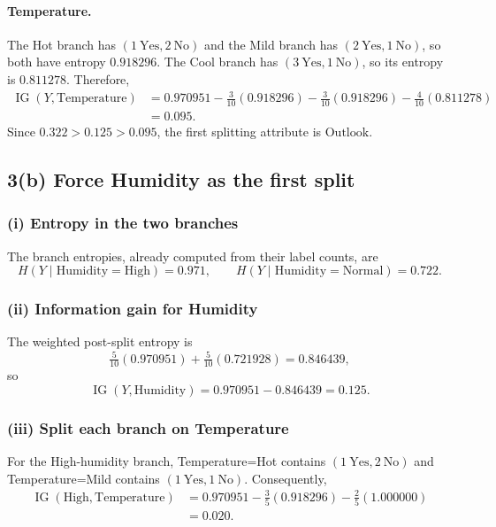 \documentclass[11pt]{article}
\newcommand{\entropy}{H}
\newcommand{\IG}{\operatorname{IG}}
\begin{document}
\paragraph{Temperature.}
The Hot branch has $(1\ \mathrm{Yes},2\ \mathrm{No})$ and the Mild branch has
$(2\ \mathrm{Yes},1\ \mathrm{No})$, so both have entropy $0.918296$.  The Cool
branch has $(3\ \mathrm{Yes},1\ \mathrm{No})$, so its entropy is $0.811278$.
Therefore,
\begin{align*}
\IG(Y,\mathrm{Temperature})
&=0.970951-\tfrac3{10}(0.918296)-\tfrac3{10}(0.918296)
 -\tfrac4{10}(0.811278)\\
&=\boxed{0.095}.
\end{align*}
Since $0.322>0.125>0.095$, the first splitting attribute is
\(\boxed{\mathrm{Outlook}}\).

\subsection*{3(b) Force Humidity as the first split}

\subsubsection*{(i) Entropy in the two branches}
The branch entropies, already computed from their label counts, are
\[
\boxed{\entropy(Y\mid \mathrm{Humidity=High})=0.971},
\qquad
\boxed{\entropy(Y\mid \mathrm{Humidity=Normal})=0.722}.
\]

\subsubsection*{(ii) Information gain for Humidity}
The weighted post-split entropy is
\[
\tfrac5{10}(0.970951)+\tfrac5{10}(0.721928)=0.846439,
\]
so
\[
\boxed{\IG(Y,\mathrm{Humidity})=0.970951-0.846439=0.125}.
\]

\subsubsection*{(iii) Split each branch on Temperature}
For the High-humidity branch, Temperature=Hot contains $(1\ \mathrm{Yes},2\ \mathrm{No})$
and Temperature=Mild contains $(1\ \mathrm{Yes},1\ \mathrm{No})$.  Consequently,
\begin{align*}
\IG(\mathrm{High},\mathrm{Temperature})
&=0.970951-\tfrac35(0.918296)-\tfrac25(1.000000)\\
&=\boxed{0.020}.
\end{align*}
\end{document}
